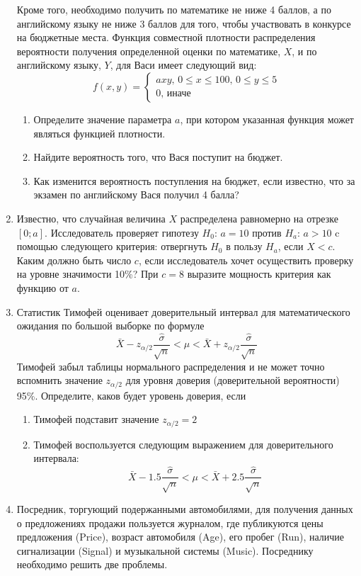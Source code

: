 \documentclass[pdftex,12pt,a4paper]{article}
\begin{document}
\begin{enumerate}
Кроме того, необходимо получить по математике не
ниже 4 баллов, а по английскому языку не ниже 3 баллов для того, чтобы участвовать в
конкурсе на бюджетные места. Функция совместной плотности распределения
вероятности получения определенной оценки по математике, $X$, и по английскому языку, $Y$, для Васи имеет следующий вид:
\[
f(x,y)=
\begin{cases}
axy, \, 0\leq x\leq 100,\, 0\leq y\leq 5 \\
0,\, \text{иначе}
\end{cases}
\]
\begin{enumerate}
\item Определите значение параметра $a$, при котором указанная
функция может являться функцией плотности. 
\item Найдите вероятность того, что Вася
поступит на бюджет. 
\item Как изменится вероятность поступления на бюджет, если известно,
что за экзамен по английскому Вася получил 4 балла?
\end{enumerate}


\item Известно, что случайная величина $X$ распределена равномерно на отрезке $[0; a]$.
Исследователь проверяет гипотезу $H_0$: $a=10$ против $H_a$: $a>10$ c помощью
следующего критерия: отвергнуть $H_0$ в пользу $H_a$, если $X<c$. Каким должно быть
число $c$, если исследователь хочет осуществить проверку на уровне значимости 10\%? При
$c=8$ выразите мощность критерия как функцию от $a$.

\item Статистик Тимофей оценивает доверительный интервал для математического ожидания по большой выборке по формуле
\[
\bar{X}-z_{\alpha/2}\frac{\hat{\sigma}}{\sqrt{n}} < \mu < \bar{X}+z_{\alpha/2}\frac{\hat{\sigma}}{\sqrt{n}}
\]
Тимофей забыл таблицы нормального распределения и не может точно вспомнить значение $z_{\alpha/2}$ для уровня
доверия (доверительной вероятности) 95\%. Определите, каков будет уровень доверия, если
\begin{enumerate}
\item Тимофей подставит значение $z_{\alpha/2}=2$
\item Тимофей воспользуется следующим выражением для доверительного интервала:
\[
\bar{X}-1.5\frac{\hat{\sigma}}{\sqrt{n}} < \mu < \bar{X}+2.5\frac{\hat{\sigma}}{\sqrt{n}}
\]
\end{enumerate}


\item Посредник, торгующий подержанными автомобилями, для получения данных о
предложениях продажи пользуется журналом, где публикуются цены предложения (Price),
возраст автомобиля (Age), его пробег (Run), наличие сигнализации (Signal) и музыкальной
системы (Music). Посреднику необходимо решить две проблемы.


\end{enumerate}
\end{document}
